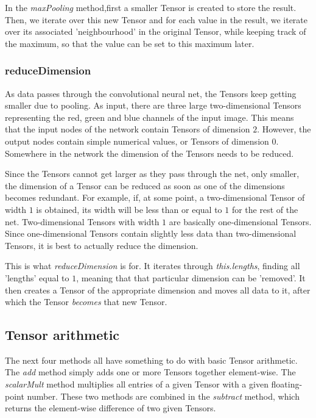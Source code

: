 \documentclass[12pt, titlepage]{article}
\begin{document}
		In the \textit{maxPooling} method,first a smaller Tensor is created to store the result. Then, we iterate over this new Tensor and for each value in the result, we iterate over its associated 'neighbourhood' in the original Tensor, while keeping track of the maximum, so that the value can be set to this maximum later.
		
		\subsubsection{reduceDimension}
		As data passes through the convolutional neural net, the Tensors keep getting smaller due to pooling. As input, there are three large two-dimensional Tensors representing the red, green and blue channels of the input image. This means that the input nodes of the network contain Tensors of dimension $2$. However, the output nodes contain simple numerical values, or Tensors of dimension $0$. Somewhere in the network the dimension of the Tensors needs to be reduced.
		
		Since the Tensors cannot get larger as they pass through the net, only smaller, the dimension of a Tensor can be reduced as soon as one of the dimensions becomes redundant. For example, if, at some point, a two-dimensional Tensor of width $1$ is obtained, its width will be less than or equal to $1$ for the rest of the net. Two-dimensional Tensors with width $1$ are basically one-dimensional Tensors. Since one-dimensional Tensors contain slightly less data than two-dimensional Tensors, it is best to actually reduce the dimension.
		
		This is what \textit{reduceDimension} is for. It iterates through \textit{this.lengths}, finding all 'lengths' equal to $1$, meaning that that particular dimension can be 'removed'. It then creates a Tensor of the appropriate dimension and moves all data to it, after which the Tensor \textit{becomes} that new Tensor.
		
		\subsection{Tensor arithmetic}
		The next four methods all have something to do with basic Tensor arithmetic. The \textit{add} method simply adds one or more Tensors together element-wise. The \textit{scalarMult} method multiplies all entries of a given Tensor with a given floating-point number. These two methods are combined in the \textit{subtract} method, which returns the element-wise difference of two given Tensors.
		
\end{document}
